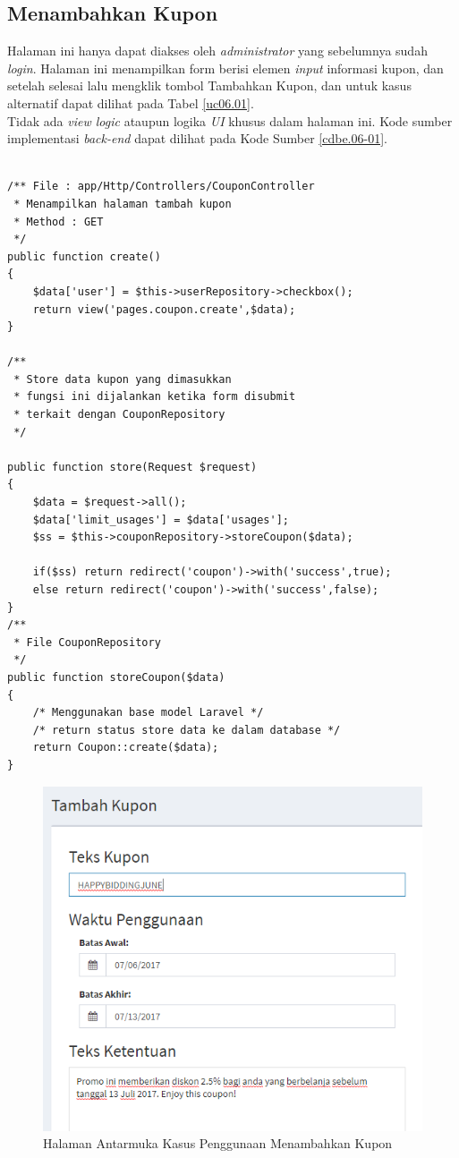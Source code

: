 \subsection{Menambahkan Kupon}
Halaman ini hanya dapat diakses oleh \textit{administrator} yang sebelumnya sudah \textit{login}. Halaman ini menampilkan form berisi elemen \textit{input} informasi kupon, dan setelah selesai lalu mengklik tombol Tambahkan Kupon, dan untuk kasus alternatif dapat dilihat pada Tabel \ref{uc06.01}.\\
\indent Tidak ada \textit{view logic} ataupun logika \textit{UI} khusus dalam halaman ini. Kode sumber implementasi \textit{back-end} dapat dilihat pada Kode Sumber \ref{cdbe.06-01}.
\newpage
\begin{lstlisting}[label=cdbe.06-01,style=php,caption=Implementasi Antarmuka Menambahkan Kupon]

/** File : app/Http/Controllers/CouponController
 * Menampilkan halaman tambah kupon
 * Method : GET
 */
public function create()
{
    $data['user'] = $this->userRepository->checkbox();
    return view('pages.coupon.create',$data);
}

/**
 * Store data kupon yang dimasukkan
 * fungsi ini dijalankan ketika form disubmit
 * terkait dengan CouponRepository
 */

public function store(Request $request)
{
    $data = $request->all();
    $data['limit_usages'] = $data['usages'];
    $ss = $this->couponRepository->storeCoupon($data);

    if($ss) return redirect('coupon')->with('success',true);
    else return redirect('coupon')->with('success',false);
}
/**
 * File CouponRepository
 */
public function storeCoupon($data)
{
	/* Menggunakan base model Laravel */
	/* return status store data ke dalam database */
    return Coupon::create($data);
}  
\end{lstlisting}
	  
      \begin{figure}[H]
        \centering
        \includegraphics[width=.9\textwidth]{images/bab4/ui/06-01.png}
        \caption{Halaman Antarmuka Kasus Penggunaan Menambahkan Kupon}
        \label{ui.01-01}
      \end{figure}
      
